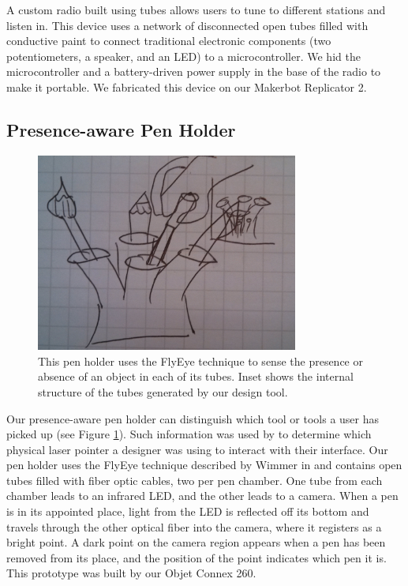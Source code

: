 A custom radio built using tubes allows users to tune to different stations and listen in.  This device uses a network of disconnected open tubes filled with conductive paint to connect traditional electronic components (two potentiometers, a speaker, and an LED) to a microcontroller.  We hid the microcontroller and a battery-driven power supply in the base of the radio to make it portable.  We fabricated this device on our Makerbot Replicator 2.

\subsection{Presence-aware Pen Holder}

\begin{figure}[h]
\centering
    \includegraphics[width=3.4in]{figures/placeholder/pens.jpg}
\caption{This pen holder uses the FlyEye technique to sense the presence or absence of an object in each of its tubes.  Inset shows the internal structure of the tubes generated by our design tool.}
\label{fig:pens}
\end{figure}

Our presence-aware pen holder can distinguish which tool or tools a user has picked up (see Figure \ref{fig:pens}).  Such information was used by \cite{Mueller-constructable} to determine which physical laser pointer a designer was using to interact with their interface.  Our pen holder uses the FlyEye technique described by Wimmer in \cite{Wimmer-flyeye} and contains open tubes filled with fiber optic cables, two per pen chamber.  One tube from each chamber leads to an infrared LED, and the other leads to a camera.  When a pen is in its appointed place, light from the LED is reflected off its bottom and travels through the other optical fiber into the camera, where it registers as a bright point.  A dark point on the camera region appears when a pen has been removed from its place, and the position of the point indicates which pen it is.  This prototype was built by our Objet Connex 260.

